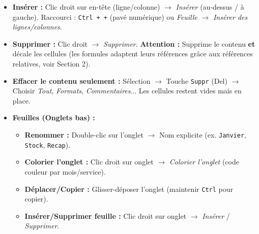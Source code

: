 \documentclass[11pt]{article}
\begin{document}
\begin{propriete}
\begin{itemize}
    \item \textbf{Insérer :} Clic droit sur en-tête (ligne/colonne) $\to$ \textit{Insérer} (au-dessus / à gauche). Raccourci : \texttt{Ctrl + +} (pavé numérique) ou \textit{Feuille} $\to$ \textit{Insérer des lignes/colonnes}.
    \item \textbf{Supprimer :} Clic droit $\to$ \textit{Supprimer}. \textbf{Attention :} Supprime le contenu \textbf{et} décale les cellules (les formules adaptent leurs références grâce aux références relatives, voir Section 2).
    \item \textbf{Effacer le contenu seulement :} Sélection $\to$ Touche \texttt{Suppr} (Del) $\to$ Choisir \textit{Tout}, \textit{Formats}, \textit{Commentaires}... Les cellules restent vides mais en place.
    \item \textbf{Feuilles (Onglets bas) :}
        \begin{itemize}
            \item \textbf{Renommer :} Double-clic sur l'onglet $\to$ Nom explicite (ex. \texttt{Janvier}, \texttt{Stock}, \texttt{Recap}).
            \item \textbf{Colorier l'onglet :} Clic droit sur onglet $\to$ \textit{Colorier l'onglet} (code couleur par mois/service).
            \item \textbf{Déplacer/Copier :} Glisser-déposer l'onglet (maintenir \texttt{Ctrl} pour copier).
            \item \textbf{Insérer/Supprimer feuille :} Clic droit sur onglet $\to$ \textit{Insérer} / \textit{Supprimer}.
        \end{itemize}
\end{itemize}
\end{propriete}
\end{document}
